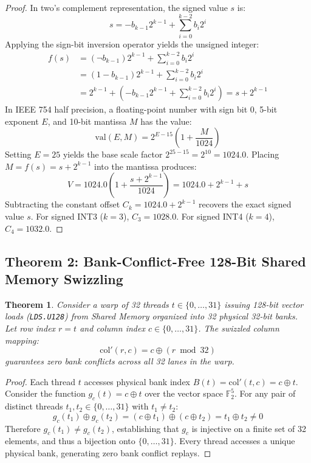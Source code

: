 \documentclass[10pt,twocolumn,letterpaper]{article}
\newtheorem{theorem}{Theorem}
\begin{document}
\begin{proof}
In two's complement representation, the signed value $s$ is:
\begin{equation}
s = -b_{k-1} 2^{k-1} + \sum_{i=0}^{k-2} b_i 2^i
\end{equation}
Applying the sign-bit inversion operator yields the unsigned integer:
\begin{align}
f(s) &= (\neg b_{k-1}) 2^{k-1} + \sum_{i=0}^{k-2} b_i 2^i \\
     &= (1 - b_{k-1}) 2^{k-1} + \sum_{i=0}^{k-2} b_i 2^i \\
     &= 2^{k-1} + \left( -b_{k-1} 2^{k-1} + \sum_{i=0}^{k-2} b_i 2^i \right) = s + 2^{k-1}
\end{align}
In IEEE 754 half precision, a floating-point number with sign bit 0, 5-bit exponent $E$, and 10-bit mantissa $M$ has the value:
\begin{equation}
\text{val}(E, M) = 2^{E - 15} \left( 1 + \frac{M}{1024} \right)
\end{equation}
Setting $E = 25$ yields the base scale factor $2^{25 - 15} = 2^{10} = 1024.0$. Placing $M = f(s) = s + 2^{k-1}$ into the mantissa produces:
\begin{equation}
V = 1024.0 \left( 1 + \frac{s + 2^{k-1}}{1024} \right) = 1024.0 + 2^{k-1} + s
\end{equation}
Subtracting the constant offset $C_k = 1024.0 + 2^{k-1}$ recovers the exact signed value $s$. For signed INT3 ($k=3$), $C_3 = 1028.0$. For signed INT4 ($k=4$), $C_4 = 1032.0$.
\end{proof}

\subsection{Theorem 2: Bank-Conflict-Free 128-Bit Shared Memory Swizzling}
\begin{theorem}
Consider a warp of 32 threads $t \in \{0, \dots, 31\}$ issuing 128-bit vector loads (\texttt{LDS.U128}) from Shared Memory organized into 32 physical 32-bit banks. Let row index $r = t$ and column index $c \in \{0, \dots, 31\}$. The swizzled column mapping:
\begin{equation}
\text{col}'(r, c) = c \oplus (r \bmod 32)
\end{equation}
guarantees zero bank conflicts across all 32 lanes in the warp.
\end{theorem}

\begin{proof}
Each thread $t$ accesses physical bank index $B(t) = \text{col}'(t, c) = c \oplus t$. Consider the function $g_c(t) = c \oplus t$ over the vector space $\mathbb{F}_2^5$. For any pair of distinct threads $t_1, t_2 \in \{0, \dots, 31\}$ with $t_1 \ne t_2$:
\begin{equation}
g_c(t_1) \oplus g_c(t_2) = (c \oplus t_1) \oplus (c \oplus t_2) = t_1 \oplus t_2 \ne 0
\end{equation}
Therefore $g_c(t_1) \ne g_c(t_2)$, establishing that $g_c$ is injective on a finite set of 32 elements, and thus a bijection onto $\{0, \dots, 31\}$. Every thread accesses a unique physical bank, generating zero bank conflict replays.
\end{proof}
\end{document}
